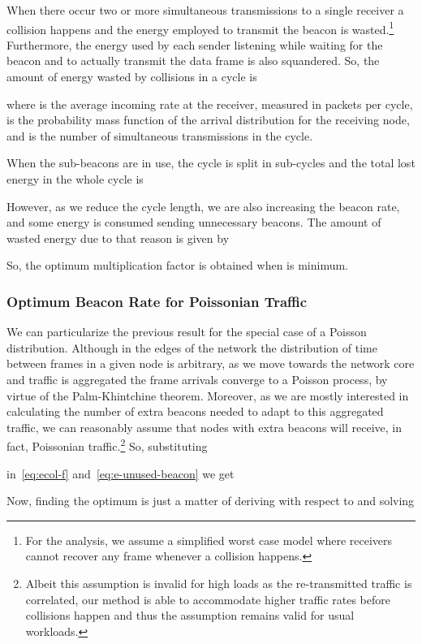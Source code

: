 \documentclass[journal,english,twocolumn,10pt,letterpaper]{IEEEtran}
\begin{document}
When there occur two or more simultaneous transmissions to a single receiver a
collision happens and the energy  employed to transmit the
beacon is wasted.\footnote{For the analysis, we assume a simplified worst case
  model where receivers cannot recover any frame whenever a collision
  happens.} Furthermore, the energy used by each sender listening while
waiting for the beacon  and to actually transmit the data
frame  is also squandered. So, the amount of energy wasted by
collisions in a cycle is

where  is the average incoming rate at the receiver, measured in
packets per cycle,  is the probability mass function of the
arrival distribution for the receiving node, and  is the number of
simultaneous transmissions in the cycle.

When the sub-beacons are in use, the cycle is split in  sub-cycles and
the total lost energy in the whole cycle is


However, as we reduce the cycle length, we are also increasing the beacon
rate, and some energy is consumed sending unnecessary beacons. The amount of
wasted energy due to that reason is given by

So, the optimum multiplication factor  is obtained when
 is
minimum.

\subsubsection{Optimum Beacon Rate for Poissonian Traffic}
\label{sec:optimum-beacon-rate}

We can particularize the previous result for the special case of a Poisson
distribution. Although in the edges of the network the distribution of time
between frames in a given node is arbitrary, as we move towards the network
core and traffic is aggregated the frame arrivals converge to a Poisson
process, by virtue of the Palm-Khintchine theorem. Moreover, as we are mostly
interested in calculating the number of extra beacons needed to adapt to this
aggregated traffic, we can reasonably assume that nodes with extra beacons
will receive, in fact, Poissonian traffic.\footnote{Albeit this assumption is
  invalid for high loads as the re-transmitted traffic is correlated, our
  method is able to accommodate higher traffic rates before collisions happen
  and thus the assumption remains valid for usual workloads.} So, substituting

in~\eqref{eq:ecol-f} and~\eqref{eq:e-unused-beacon} we get

Now, finding the optimum  is just a matter of deriving  with respect to
 and solving
\end{document}

